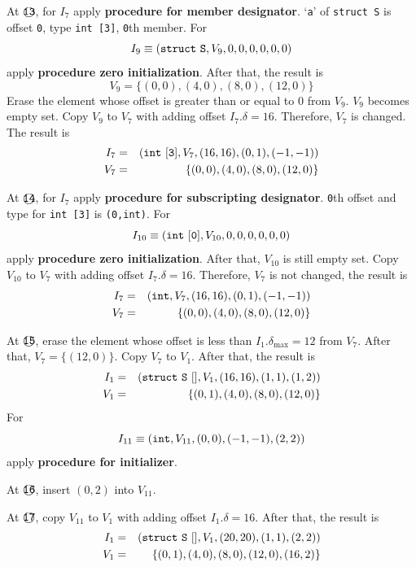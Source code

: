 \begin{Example}
\noindent
At $\MARU{\tt 13}$, for $I_7$ apply
{\bf procedure for member designator}.
`{\tt a}' of {\tt struct S} is offset {\tt{0}}, type {\tt int [3]},
 {\tt{0}}th member.
For
\[
I_9 \equiv ({\tt{struct\,\,S}},V_9,0,0,0,0,0,0)
\]
apply {\bf procedure zero initialization}.
After that, the result is
\[
 V_9 = \{(0,0), (4,0), (8,0), (12,0) \}
\]
Erase the element whose offset is greater than or equal to $0$ from $V_9$.
$V_9$ becomes empty set. Copy $V_9$ to $V_7$ with adding offset
$I_7.\delta = 16$. Therefore, $V_7$ is changed. The result is
\begin{eqnarray*}
I_7 & = & ({\tt int\,\,[3]}, V_7, (16,16), (0,1),(-1,-1)) \\
V_7 & = & \{(0,0), (4,0), (8,0), (12,0) \}
\end{eqnarray*}

\noindent
At $\MARU{\tt 14}$, for $I_7$ apply
{\bf procedure for subscripting designator}.
{\tt{0}}th offset and type for {\tt{int [3]}} is
{\tt{(0,int)}}.
For
\[
 I_{10} \equiv ({\tt{int\,\,[0]}},V_{10},0,0,0,0,0,0)
\]
apply {\bf procedure zero initialization}.
After that, $V_{10}$ is still empty set. Copy $V_{10}$ to $V_7$
with adding offset $I_7.\delta = 16$. Therefore, $V_7$ is not changed,
the result is
\begin{eqnarray*}
I_7 & = & ({\tt int}, V_7, (16,16), (0,1),(-1,-1)) \\
V_7 & = & \{(0,0), (4,0), (8,0), (12,0) \}
\end{eqnarray*}

\noindent
At $\MARU{\tt 15}$, erase the element whose offset is less than
$I_1.\delta_{\max} = 12$ from $V_7$. 
After that, $V_7 = \{ (12,0)\}$.
Copy $V_7$ to $V_1$.
After that, the result is
\begin{eqnarray*}
I_1 & = & ({\tt{struct\,\,S\,\,[]}},V_1,(16,16),(1,1),(1,2))  \\
V_1 & = & \{(0,1), (4,0), (8,0),(12,0)\}
\end{eqnarray*}
For
\[
 I_{11} \equiv ({\tt int}, V_{11}, (0,0), (-1,-1),(2,2))
\]
apply {\bf procedure for initializer}.

\noindent
At $\MARU{\tt 16}$, insert $(0,2)$  into $V_{11}$.

\noindent
At $\MARU{\tt 17}$, copy $V_{11}$ to $V_1$ with adding offset
$I_1.\delta = 16$.
After that, the result is
\begin{eqnarray*}
I_1 & = & ({\tt{struct\,\,S\,\,[]}},V_1,(20,20),(1,1),(2,2))  \\
V_1 & = & \{(0,1), (4,0), (8,0),(12,0), (16,2)\}
\end{eqnarray*}


\end{Example}

